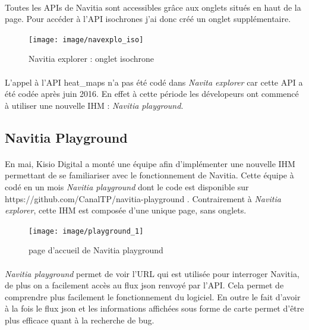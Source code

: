 \documentclass[a4paper]{report}
\begin{document}
\paragraph{} Toutes les APIs de Navitia sont accessibles grâce aux onglets situés en haut de la page. Pour accéder à l'API isochrones j'ai donc créé un onglet supplémentaire.

\begin{figure}[H]
	\begin{center}
		\texttt{[image: image/navexplo\_iso]}
		\caption{Navitia explorer : onglet isochrone}
		\label{Navitia explorer : onglet isochrone}
	\end{center}
\end{figure}

\paragraph{} L'appel à l'API heat\_maps n'a pas été codé dans \emph{Navita explorer} car cette API a été codée après juin 2016. En effet à cette période les dévelopeurs ont commencé à utiliser une nouvelle IHM : \emph{Navitia playground}.


\subsection{Navitia Playground}

\paragraph{} En mai, Kisio Digital a monté une équipe afin d'implémenter une nouvelle IHM permettant de se familiariser avec le fonctionnement de Navitia. Cette équipe à codé en un mois \emph{Navitia playground} dont le code est disponible sur \color{blue} https://github.com/CanalTP/navitia-playground \color{black}. Contrairement à \emph{Navitia explorer}, cette IHM est composée d'une unique page, sans onglets. 

\begin{figure}[H]
	\begin{center}
		\texttt{[image: image/playground\_1]}
		\caption{page d'accueil de Navitia playground}
		\label{page d'accueil de Navitia playground}
	\end{center}
\end{figure}

\paragraph{} \emph{Navitia playground} permet de voir l'URL qui est utilisée pour interroger Navitia, de plus on a facilement accès au flux json renvoyé par l'API. Cela permet de comprendre plus facilement le fonctionnement du logiciel. En outre le fait d'avoir à la fois le flux json et les informations affichées sous forme de carte permet d'être plus efficace quant à la recherche de bug.
\end{document}
